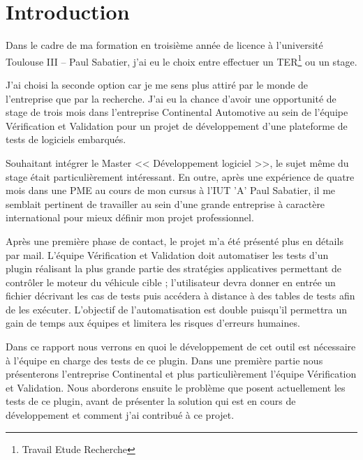 \chapter*{Introduction}
Dans le cadre de ma formation en troisième année de licence à l'université Toulouse III – Paul Sabatier, j'ai eu le choix entre effectuer un TER\footnote{Travail Etude Recherche} ou un stage. 

J'ai choisi la seconde option car je me sens plus attiré par le monde de l'entreprise que par la recherche. J'ai eu la chance d'avoir une opportunité de stage de trois mois dans l'entreprise Continental Automotive au sein de l'équipe Vérification et Validation pour un projet de développement d'une plateforme de tests de logiciels embarqués.

Souhaitant intégrer le Master << Développement logiciel >>, le sujet même du stage était particulièrement intéressant. En outre, après une expérience de quatre mois dans une PME au cours de mon cursus à l'IUT 'A' Paul Sabatier, il me semblait pertinent de travailler au sein d'une grande entreprise à caractère international pour mieux définir mon projet professionnel.

Après une première phase de contact, le projet m'a été présenté plus en détails par mail. L'équipe Vérification et Validation doit automatiser les tests d'un plugin réalisant la plus grande partie des stratégies applicatives permettant de contrôler le moteur du véhicule cible ; l'utilisateur devra donner en entrée un fichier décrivant les cas de tests puis accédera à distance à des tables de tests afin de les exécuter. L'objectif de l'automatisation est double puisqu'il permettra un gain de temps aux équipes et limitera les risques d'erreurs humaines.

Dans ce rapport nous verrons en quoi le développement de cet outil est nécessaire à l'équipe en charge des tests de ce plugin. Dans une première partie nous présenterons l'entreprise Continental et plus particulièrement l'équipe Vérification et Validation. Nous aborderons ensuite le problème que posent actuellement les tests de ce plugin, avant de présenter la solution qui est en cours de développement et comment j'ai contribué à ce projet.
